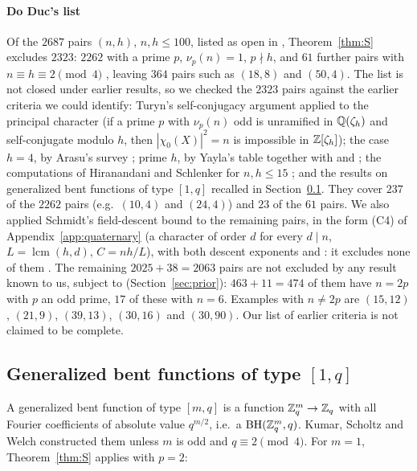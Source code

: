 \paragraph{Do Duc's list}
Of the $2687$ pairs $(n,h)$, $n,h\le100$, listed as open in
\cite[Remark~3.13]{DoDuc2019}, Theorem~\ref{thm:S} excludes $2323$:
$2262$ with a prime $p$, $\nu_p(n)=1$, $p\nmid h$, and $61$ further pairs
with $n\equiv h\equiv2\pmod4$ , leaving $364$ pairs such as
$(18,8)$ and $(50,4)$. The list is not closed under earlier results, so
we checked the $2323$ pairs against the earlier criteria we could
identify: Turyn's
self-conjugacy argument applied to the principal character (if a prime
$p$ with $\nu_p(n)$ odd is unramified in $\mathbb{Q}(\zeta_h)$ and self-conjugate
modulo $h$, then $|\chi_0(X)|^2=n$ is impossible in $\mathbb{Z}[\zeta_h]$); the
case $h=4$, by Arasu's survey \cite[Remark after Thm.~4.11]{Arasu2011};
prime $h$, by Yayla's table \cite[Table~2]{Yayla2016} together with
\cite{FengXiang2008} and \cite[Thm.~6.5]{LeungSchmidtZhang2023}; the
computations of Hiranandani and Schlenker for $n,h\le15$
\cite[Table~1]{HiranandaniSchlenker2016}; and the results on generalized
bent functions of type $[1,q]$ recalled in Section~\ref{ssec:ksw}. They
cover $237$ of the $2262$ pairs (e.g.\ $(10,4)$ \cite{Turyn1970} and
$(24,4)$) and $23$ of the $61$ pairs. We also applied Schmidt's
field-descent bound \cite{Schmidt1999,LeungSchmidt2005} to the remaining
pairs, in the form (C4) of Appendix~\ref{app:quaternary} (a character
of order $d$ for every $d\mid n$, $L=\operatorname{lcm}(h,d)$,
$C=nh/L$), with both descent exponents \cite[Def.~2.6]{LeungSchmidt2005}
and \cite[Def.~2.10]{LeungSchmidt2012}: it excludes none of them
. The remaining $2025+38=2063$ pairs are not excluded by any
result known to us, subject to \cite{LeungChueZhao2025}
(Section~\ref{sec:prior}): $463+11=474$ of them have $n=2p$ with $p$ an
odd prime, $17$ of these with $n=6$. Examples with $n\ne2p$ are
$(15,12)$, $(21,9)$, $(39,13)$, $(30,16)$ and $(30,90)$. Our list of
earlier criteria is not claimed to be complete.

\subsection{Generalized bent functions of type $[1,q]$}\label{ssec:ksw}

A generalized bent function of type $[m,q]$ is a function
$\mathbb{Z}_q^m\to\mathbb{Z}_q$ with all Fourier coefficients of absolute value
$q^{m/2}$, i.e.\ a $\operatorname{BH}(\mathbb{Z}_q^m,q)$. Kumar, Scholtz and Welch
\cite{KumarScholtzWelch1985} constructed them unless $m$ is odd and
$q\equiv2\pmod4$. For $m=1$, Theorem~\ref{thm:S} applies with $p=2$:

